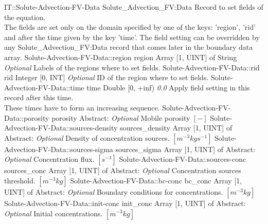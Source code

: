 \begin{RecordType}
	{IT::Solute-Advection-FV-Data}
	{Solute{\_}Advection{\_}FV:Data}
	{} %
	{} %
	{{{Record to set fields of the equation.}\\{
The fields are set only on the domain specified by one of the keys: 'region', 'rid'}\\{
and after the time given by the key 'time'. The field setting can be overridden by}\\{
 any Solute{\_}Advection{\_}FV:Data record that comes later in the boundary data array.}}}
		\RecKey
			{Solute-Advection-FV-Data::region}
			{region}
			{{Array [1, UINT] of }{String}}
			{ \it{Optional} }
			{{{Labels of the regions where to set fields. }}}
		\RecKey
			{Solute-Advection-FV-Data::rid}
			{rid}
			{{Integer [0, INT]}}
			{ \it{Optional} }
			{{{ID of the region where to set fields.}}}
		\RecKey
			{Solute-Advection-FV-Data::time}
			{time}
			{{Double [0, +inf)}}
			{ \it{0.0} }
			{{{Apply field setting in this record after this time.}\\{
These times have to form an increasing sequence.}}}
		\RecKey
			{Solute-Advection-FV-Data::porosity}
			{porosity}
			{{Abstract}{: }}
			{ \it{Optional} }
			{{{Mobile porosity }{$[-]$}}}
		\RecKey
			{Solute-Advection-FV-Data::sources-density}
			{sources{\_}density}
			{{Array [1, UINT] of }{Abstract}{: }}
			{ \it{Optional} }
			{{{Density of concentration sources. }{$[m^{-3}kgs^{-1}]$}}}
		\RecKey
			{Solute-Advection-FV-Data::sources-sigma}
			{sources{\_}sigma}
			{{Array [1, UINT] of }{Abstract}{: }}
			{ \it{Optional} }
			{{{Concentration flux. }{$[s^{-1}]$}}}
		\RecKey
			{Solute-Advection-FV-Data::sources-conc}
			{sources{\_}conc}
			{{Array [1, UINT] of }{Abstract}{: }}
			{ \it{Optional} }
			{{{Concentration sources threshold. }{$[m^{-3}kg]$}}}
		\RecKey
			{Solute-Advection-FV-Data::bc-conc}
			{bc{\_}conc}
			{{Array [1, UINT] of }{Abstract}{: }}
			{ \it{Optional} }
			{{{Boundary conditions for concentrations. }{$[m^{-3}kg]$}}}
		\RecKey
			{Solute-Advection-FV-Data::init-conc}
			{init{\_}conc}
			{{Array [1, UINT] of }{Abstract}{: }}
			{ \it{Optional} }
			{{{Initial concentrations. }{$[m^{-3}kg]$}}}
\end{RecordType}
